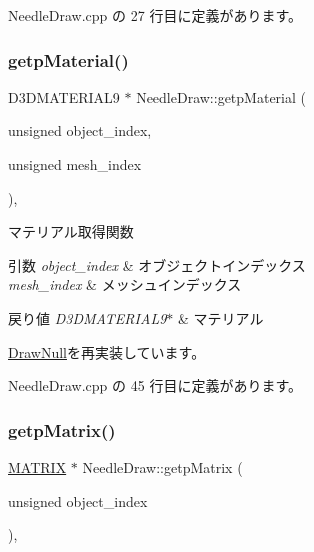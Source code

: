  Needle\+Draw.\+cpp の 27 行目に定義があります。

\mbox{\label{class_needle_draw_aff38ea3f7201eb584e81ae9d6b9328cf}} 
\subsubsection{\texorpdfstring{getp\+Material()}{getpMaterial()}}
{\footnotesize\ttfamily D3\+D\+M\+A\+T\+E\+R\+I\+A\+L9 $\ast$ Needle\+Draw\+::getp\+Material (\begin{DoxyParamCaption}\item[{unsigned}]{object\+\_\+index,  }\item[{unsigned}]{mesh\+\_\+index }\end{DoxyParamCaption})\hspace{0.3cm}{\ttfamily [override]}, {\ttfamily [virtual]}}



マテリアル取得関数 


\begin{DoxyParams}{引数}
{\em object\+\_\+index} & オブジェクトインデックス \\
\hline
{\em mesh\+\_\+index} & メッシュインデックス \\
\hline
\end{DoxyParams}

\begin{DoxyRetVals}{戻り値}
{\em D3\+D\+M\+A\+T\+E\+R\+I\+A\+L9$\ast$} & マテリアル \\
\hline
\end{DoxyRetVals}


\mbox{\hyperlink{class_draw_null_a0c1efe55fea325ad277594be6fe1e938}{Draw\+Null}}を再実装しています。



 Needle\+Draw.\+cpp の 45 行目に定義があります。

\mbox{\label{class_needle_draw_a7ae74f52a190793745b5339a6be559d7}} 
\subsubsection{\texorpdfstring{getp\+Matrix()}{getpMatrix()}}
{\footnotesize\ttfamily \mbox{\hyperlink{_matrix_8h_a032295cd9fb1b711757c90667278e744}{M\+A\+T\+R\+IX}} $\ast$ Needle\+Draw\+::getp\+Matrix (\begin{DoxyParamCaption}\item[{unsigned}]{object\+\_\+index }\end{DoxyParamCaption})\hspace{0.3cm}{\ttfamily [override]}, {\ttfamily [virtual]}}



